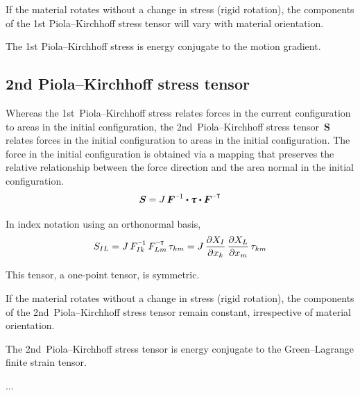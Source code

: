 {If the material rotates without a change in stress (rigid rotation), the components of the 1st Piola\hbox{--}Kirchhoff stress tensor will vary with material orientation.

The 1st Piola\hbox{--}Kirchhoff stress is energy conjugate to the motion gradient.

\subsection*{2nd Piola\hbox{--}Kirchhoff stress tensor}

Whereas the 1st~Piola\hbox{--}Kirchhoff stress relates forces in the current configuration to areas in the initial configuration, the 2nd~Piola\hbox{--}Kirchhoff stress tensor~$\bm{S}$ relates forces in the initial configuration to areas in the initial configuration. The force in the initial configuration is obtained via a mapping that preserves the relative relationship between the force direction and the area normal in the initial configuration.
\[
\bm{S} = J \, \bm{F}^{\expminusone} \dotp \cauchystress \dotp \bm{F}^{\expminusT}
\]

In index notation using an orthonormal basis,
\[
S_{IL} = J \, F_{Ik}^{\expminusone} \, F_{Lm}^{\expminusT} \, \tau_{km} =
J \, \frac{\partial X_{I}}{\partial x_{k}} \, \frac{\partial X_{L}}{\partial x_{m}} \, \tau_{km}
\]

This tensor, a one\hbox{-}point tensor, is symmetric.

If the material rotates without a change in stress (rigid rotation), the components of the 2nd~Piola\hbox{--}Kirchhoff stress tensor remain constant, irrespective of material orientation.

The 2nd~Piola\hbox{--}Kirchhoff stress tensor is energy conjugate to the Green\hbox{--}Lagrange finite strain tensor.
\par}


...



\newpage




